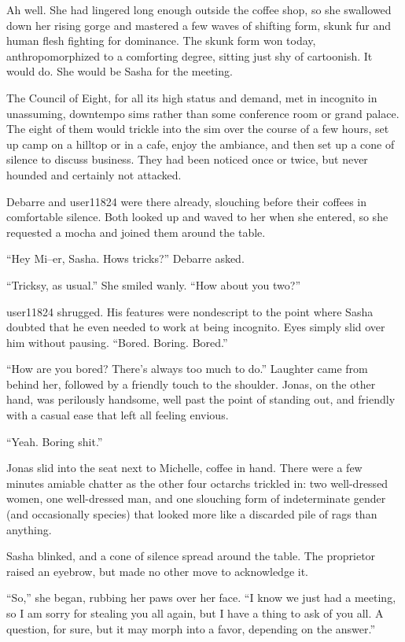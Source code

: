 Ah well. She had lingered long enough outside the coffee shop, so she swallowed down her rising gorge and mastered a few waves of shifting form, skunk fur and human flesh fighting for dominance. The skunk form won today, anthropomorphized to a comforting degree, sitting just shy of cartoonish. It would do. She would be Sasha for the meeting.

The Council of Eight, for all its high status and demand, met in incognito in unassuming, downtempo sims rather than some conference room or grand palace. The eight of them would trickle into the sim over the course of a few hours, set up camp on a hilltop or in a cafe, enjoy the ambiance, and then set up a cone of silence to discuss business. They had been noticed once or twice, but never hounded and certainly not attacked.

Debarre and user11824 were there already, slouching before their coffees in comfortable silence. Both looked up and waved to her when she entered, so she requested a mocha and joined them around the table.

``Hey Mi--er, Sasha. Hows tricks?'' Debarre asked.

``Tricksy, as usual.'' She smiled wanly. ``How about you two?''

user11824 shrugged. His features were nondescript to the point where Sasha doubted that he even needed to work at being incognito. Eyes simply slid over him without pausing. ``Bored. Boring. Bored.''

``How are you bored? There's always too much to do.'' Laughter came from behind her, followed by a friendly touch to the shoulder. Jonas, on the other hand, was perilously handsome, well past the point of standing out, and friendly with a casual ease that left all feeling envious.

``Yeah. Boring shit.''

Jonas slid into the seat next to Michelle, coffee in hand. There were a few minutes amiable chatter as the other four octarchs trickled in: two well-dressed women, one well-dressed man, and one slouching form of indeterminate gender (and occasionally species) that looked more like a discarded pile of rags than anything.

Sasha blinked, and a cone of silence spread around the table. The proprietor raised an eyebrow, but made no other move to acknowledge it.

``So,'' she began, rubbing her paws over her face. ``I know we just had a meeting, so I am sorry for stealing you all again, but I have a thing to ask of you all. A question, for sure, but it may morph into a favor, depending on the answer.''

